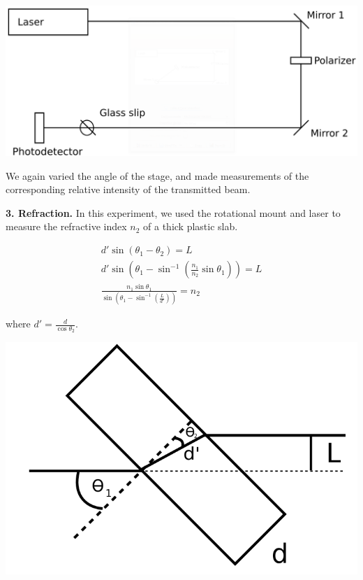 \documentclass{article}
\newenvironment{2colfig}{
  \par\medskip\noindent\minipage{\linewidth}
} {
  \endminipage\par\medskip
}
\begin{document}
\begin{multicols*}{2}
\begin{2colfig}
  \center
  \includegraphics[scale=.2]{exp2}
  \label{fig:exp2}
\end{2colfig}

We again varied the angle of the stage, and made measurements of the corresponding relative intensity of the transmitted
beam. 

{\bf 3. Refraction.} In this experiment, we used the rotational mount and laser to measure the refractive index $n_2$ of a
thick plastic slab. 

\begin{gather}
  d'\sin(\theta_1 - \theta_2) = L \\
  d'\sin\left(\theta_1 - \sin^{-1}\left(\frac{n_1}{n_2}\sin\theta_1\right)\right) = L \\
  \frac{n_1\sin\theta_1}{\sin\left(\theta_1 - \sin^{-1}\left(\frac{L}{d'}\right)\right)} = n_2
\end{gather}

where $d' = \frac{d}{\cos{\theta_2}}$. 

\begin{2colfig}
  \center
  \includegraphics[scale=.2]{mathdrawing}
  \label{fig:mathdrawing}
\end{2colfig}


\end{multicols*}
\end{document}
